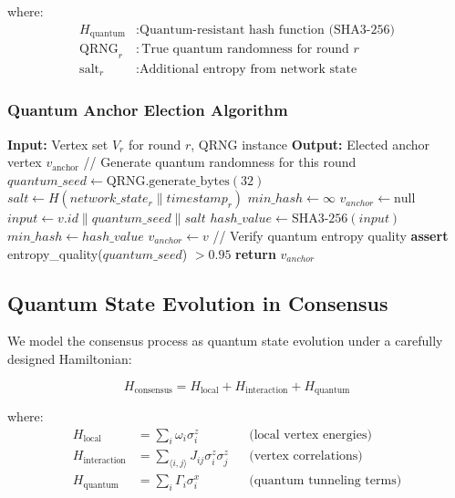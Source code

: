 \documentclass[11pt,a4paper]{article}
\begin{document}
where:
\begin{align}
H_{\text{quantum}} &: \text{Quantum-resistant hash function (SHA3-256)}\\
\text{QRNG}_r &: \text{True quantum randomness for round } r\\
\text{salt}_r &: \text{Additional entropy from network state}
\end{align}

\subsubsection{Quantum Anchor Election Algorithm}

\begin{algorithm}[H]
\caption{Quantum-Enhanced Anchor Election}
\begin{algorithmic}
\STATE \textbf{Input:} Vertex set $V_r$ for round $r$, QRNG instance
\STATE \textbf{Output:} Elected anchor vertex $v_{\text{anchor}}$
\STATE
\STATE // Generate quantum randomness for this round
\STATE $quantum\_seed \leftarrow \text{QRNG.generate\_bytes}(32)$
\STATE $salt \leftarrow H(network\_state_r \parallel timestamp_r)$
\STATE
\STATE $min\_hash \leftarrow \infty$
\STATE $v_{anchor} \leftarrow \text{null}$
\STATE
{}
    \STATE $input \leftarrow v.id \parallel quantum\_seed \parallel salt$
    \STATE $hash\_value \leftarrow \text{SHA3-256}(input)$
    \STATE
        \STATE $min\_hash \leftarrow hash\_value$
        \STATE $v_{anchor} \leftarrow v$
    \ENDIF
\ENDFOR
\STATE
\STATE // Verify quantum entropy quality
\STATE \textbf{assert} entropy\_quality($quantum\_seed$) $> 0.95$
\STATE
\STATE \textbf{return} $v_{anchor}$
\end{algorithmic}
\end{algorithm}

\subsection{Quantum State Evolution in Consensus}

We model the consensus process as quantum state evolution under a carefully designed Hamiltonian:

\begin{equation}
H_{\text{consensus}} = H_{\text{local}} + H_{\text{interaction}} + H_{\text{quantum}}
\end{equation}

where:
\begin{align}
H_{\text{local}} &= \sum_i \omega_i \sigma_i^z &&\text{(local vertex energies)}\\
H_{\text{interaction}} &= \sum_{\langle i,j \rangle} J_{ij} \sigma_i^z \sigma_j^z &&\text{(vertex correlations)}\\
H_{\text{quantum}} &= \sum_i \Gamma_i \sigma_i^x &&\text{(quantum tunneling terms)}
\end{align}
\end{document}
